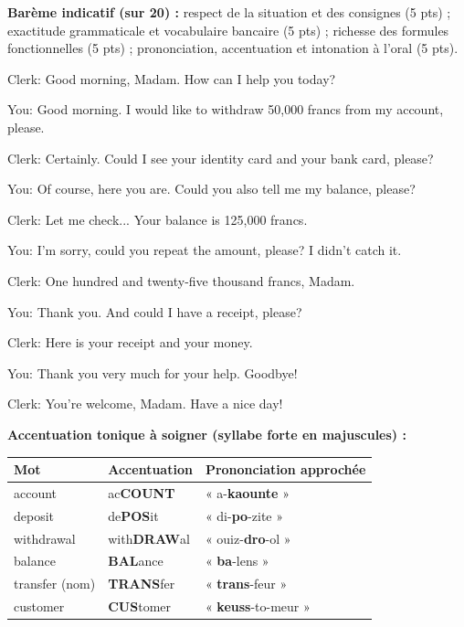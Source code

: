 \documentclass[11pt]{article}
\begin{document}
\begin{corrige}
\textbf{Barème indicatif (sur 20) :} respect de la situation et des consignes (5 pts) ; exactitude grammaticale et vocabulaire bancaire (5 pts) ; richesse des formules fonctionnelles (5 pts) ; prononciation, accentuation et intonation à l'oral (5 pts).

\begin{textebox}
Clerk: Good morning, Madam. How can I help you today?

You: Good morning. I would like to withdraw 50,000 francs from my account, please.

Clerk: Certainly. Could I see your identity card and your bank card, please?

You: Of course, here you are. Could you also tell me my balance, please?

Clerk: Let me check... Your balance is 125,000 francs.

You: I'm sorry, could you repeat the amount, please? I didn't catch it.

Clerk: One hundred and twenty-five thousand francs, Madam.

You: Thank you. And could I have a receipt, please?

Clerk: Here is your receipt and your money.

You: Thank you very much for your help. Goodbye!

Clerk: You're welcome, Madam. Have a nice day!
\end{textebox}

\textbf{Accentuation tonique à soigner (syllabe forte en majuscules) :}
\begin{center}
\begin{tabular}{|l|l|l|}
\hline
\rowcolor{popblueL} Mot & Accentuation & Prononciation approchée \\
\hline
account & ac\textbf{COUNT} & « a-\textbf{kaounte} » \\
\hline
deposit & de\textbf{POS}it & « di-\textbf{po}-zite » \\
\hline
withdrawal & with\textbf{DRAW}al & « ouiz-\textbf{dro}-ol » \\
\hline
balance & \textbf{BAL}ance & « \textbf{ba}-lens » \\
\hline
transfer (nom) & \textbf{TRANS}fer & « \textbf{trans}-feur » \\
\hline
customer & \textbf{CUS}tomer & « \textbf{keuss}-to-meur » \\
\hline
\end{tabular}
\end{center}


\end{corrige}
\end{document}
